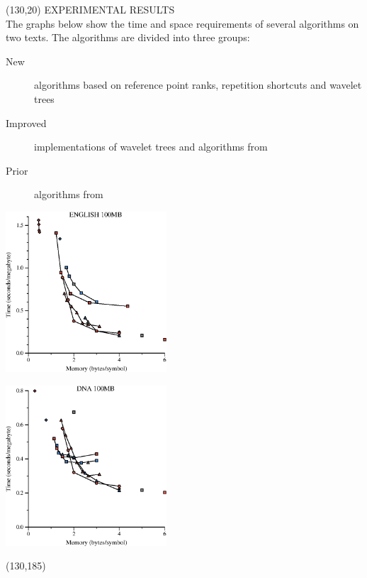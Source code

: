 \documentclass[a4paper]{article} %
\begin{document}
\begin{textblock}{60}(130,20)
  {\sffamily\normalsize{\color{sciorange}
      EXPERIMENTAL RESULTS}}\vspace{1mm}\\
  \footnotesize 
  The graphs below show the time and space requirements of several
  algorithms on two texts.  The algorithms are divided
  into three groups:
  \begin{description}
  \item[\color{new}New] algorithms based on reference point ranks, repetition
    shortcuts and wavelet trees
  \item[\color{improved}Improved] implementations of wavelet trees and
    algorithms from~\cite{ll2005}
  \item[\color{prior}Prior] algorithms from~\cite{s2001,ll2005}
  \end{description}
  \vspace{2mm}

  \includegraphics[width=60mm]{eng100Mb-new}
  \vspace{2mm}

  \includegraphics[width=60mm]{dna100Mb-new}
\end{textblock}


\begin{textblock}{60}(130,185)
  \def\refname{\normalfont\sffamily\normalsize{\color{sciorange}REFERENCES}}
  \scriptsize\sffamily
  
  
\end{textblock}

\end{document}
